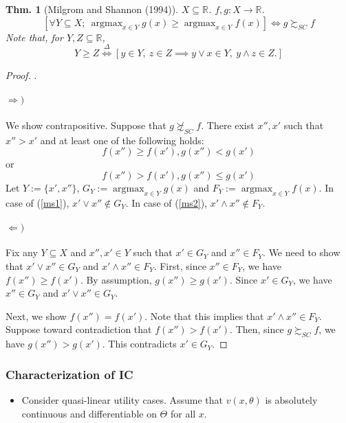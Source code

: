 \documentclass[11pt,a4paper,dvipdfmx]{article}
\theoremstyle{plain}
\newtheorem{thm}{Thm.}[section]
\newcommand{\R}{\mathbb{R}}
\newcommand{\defi}{\stackrel{\Delta}{\Longleftrightarrow}}
\newcommand{\equi}{\Longleftrightarrow}
\newcommand{\1}{\mathbbm{1}}
\DeclareMathOperator*{\argmax}{argmax}
\begin{document}
\begin{thm}[Milgrom and Shannon (1994)]
	$X \subseteq \R$. $f,g: X \to \R$.
	\[
	[\forall Y \subseteq X; \ \argmax_{x \in Y} g(x) \geq \argmax_{x \in Y} f(x)
	]
	\equi g \succsim_{SC} f
	\]
	Note that, for $Y,Z \subseteq \R$,
	\[
	Y \geq Z
	\defi  [y \in Y, \ z \in Z
	\implies y \vee x \in Y, \ y \wedge z \in Z.
	]
	\]
\end{thm}
\begin{proof}.
	\paragraph{$\Rightarrow)$}
	We show contrapositive. Suppose that $g \not\succsim_{SC} f$.
	There exist $x'', x'$ such that $x'' > x'$ and at least one of the following holds:
	\begin{equation}
		f(x'') \geq f(x'), g(x'') < g(x') \label{ms1}
	\end{equation}
	or
	\begin{equation}
		f(x'') > f(x'), g(x'') \leq g(x') \label{ms2}
	\end{equation}
	Let $Y := \{x', x''\}$, $G_Y := \argmax_{x \in Y} g(x)$ and $F_Y := \argmax_{x \in Y} f(x)$.
	In case of (\ref{ms1}), $x' \vee x'' \notin G_Y$. In case of (\ref{ms2}), $x' \wedge x'' \notin F_Y$.
	
	\paragraph{$\Leftarrow)$}
	Fix any $Y \subseteq X$ and $x'', x' \in Y$ such that $x' \in G_Y$ and $x'' \in F_Y$. We need to show that $x' \vee x'' \in G_Y$ and $x' \wedge x'' \in F_Y$.
	First, since $x'' \in F_Y$, we have $f(x'') \geq f(x')$. By assumption, $g(x'') \geq g(x')$. Since $x' \in G_Y$, we have $x'' \in G_Y$ and $x' \vee x'' \in G_Y$.
	
	Next, we show $f(x'') = f(x')$. Note that this implies that $x' \wedge x'' \in F_Y$. 
	Suppose toward contradiction that $f(x'') > f(x')$. Then, since $g \succsim_{SC} f$, we have $g(x'') > g(x')$. This contradicts $x' \in G_Y$.
\end{proof}


\subsubsection{Characterization of IC}

\begin{itemize}
	\item Consider quasi-linear utility cases. Assume that $v(x, \theta)$ is absolutely continuous and differentiable on $\Theta$ for all $x$.
\end{itemize}
\end{document}
